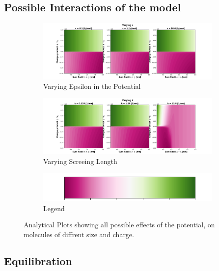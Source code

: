\documentclass[draft, english]{volcanica-template}
\begin{document}
\subsection{Possible Interactions of the model}

\begin{figure}[!htbp]
\centering
\begin{figure}[!htbp]
\centering
\includegraphics[width=0.7\linewidth]{files/varying_epsilon-810f807f02d75c73decbca2fe2f94429.png}
\caption[]{Varying Epsilon in the Potential}
\label{Fig2_PotentialPlot}
\end{figure}

\begin{figure}[!htbp]
\centering
\includegraphics[width=0.7\linewidth]{files/varying_k-1807ae5f28d378c793fe1708676a40de.png}
\caption[]{Varying Screeing Length}
\label{Fig2_PotentialPlot-b}
\end{figure}

\begin{figure}[!htbp]
\centering
\includegraphics[width=0.7\linewidth]{files/colorbar-16a5ebb9ef94b55be3e7be0521e48a9d.png}
\caption[]{Legend}
\label{Fig2_PotentialPlot-c}
\end{figure}
\caption[]{Analytical Plots showing all possible effects of the potential, on molecules of diffrent size and charge.}
\label{Fig2_PotentialPlot-c}
\end{figure}

\subsection{Equilibration}
\end{document}
